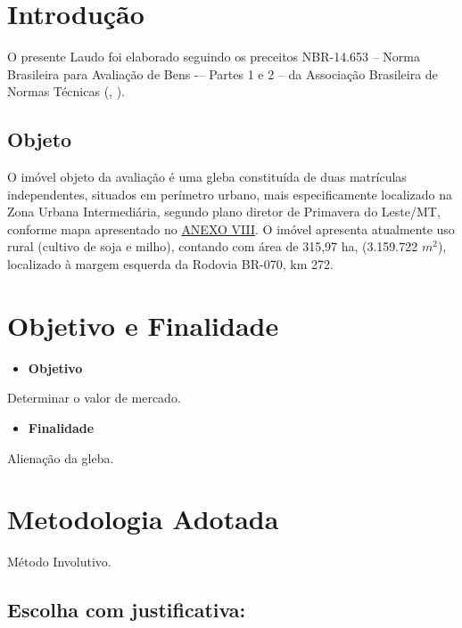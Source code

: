 \documentclass[
  10pt,
  a4paper]{article}
\providecommand{\tightlist}{%
  \setlength{\itemsep}{0pt}\setlength{\parskip}{0pt}}
\begin{document}
\newpage

\section{Introdução}\label{introduuxe7uxe3o}

O presente Laudo foi elaborado seguindo os preceitos NBR-14.653 -- Norma
Brasileira para Avaliação de Bens -\/-- Partes 1 e 2 -- da Associação
Brasileira de Normas Técnicas (,
).

\subsection{Objeto}\label{objeto}

O imóvel objeto da avaliação é uma gleba constituída de duas matrículas
independentes, situados em perímetro urbano, mais especificamente
localizado na Zona Urbana Intermediária, segundo plano diretor de
Primavera do Leste/MT, conforme mapa apresentado no
\hyperref[anexo-viii]{ANEXO VIII}. O imóvel apresenta atualmente uso
rural (cultivo de soja e milho), contando com área de 315,97 ha,
(3.159.722 \(m^2\)), localizado à margem esquerda da Rodovia BR-070, km
272.

\section{Objetivo e Finalidade}\label{objetivo-e-finalidade}

\begin{itemize}
\tightlist
\item
  \textbf{Objetivo}
\end{itemize}

Determinar o valor de mercado.

\begin{itemize}
\tightlist
\item
  \textbf{Finalidade}
\end{itemize}

Alienação da gleba.

\section{Metodologia Adotada}\label{metodologia-adotada}

Método Involutivo.

\subsection{Escolha com justificativa:}\label{escolha-com-justificativa}
\end{document}
